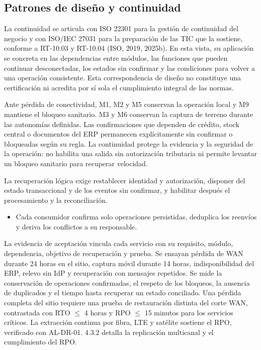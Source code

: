 \subsection{Patrones de diseño y continuidad}

\label{sec:continuidad-logica}

La continuidad se articula con ISO 22301 para la gestión de continuidad del negocio y con ISO/IEC 27031 para la preparación de las TIC que la sostiene, conforme a RT-10.03 y RT-10.04 (ISO, 2019, 2025b). En esta vista, su aplicación se concreta en las dependencias entre módulos, las funciones que pueden continuar desconectadas, los estados sin confirmar y las condiciones para volver a una operación consistente. Esta correspondencia de diseño no constituye una certificación ni acredita por sí sola el cumplimiento integral de las normas.

Ante pérdida de conectividad, M1, M2 y M5 conservan la operación local y M9 mantiene el bloqueo sanitario. M3 y M6 conservan la captura de terreno durante las autonomías definidas. Las confirmaciones que dependen de crédito, stock central o documentos del ERP permanecen explícitamente sin confirmar o bloqueadas según su regla. La continuidad protege la evidencia y la seguridad de la operación: no habilita una salida sin autorización tributaria ni permite levantar un bloqueo sanitario para recuperar velocidad.

La recuperación lógica exige restablecer identidad y autorización, disponer del estado transaccional y de los eventos sin confirmar, y habilitar después el procesamiento y la reconciliación.

\begin{itemize}
  \item Cada consumidor confirma solo operaciones persistidas, deduplica los reenvíos y deriva los conflictos a su responsable.
\end{itemize}

La evidencia de aceptación vincula cada servicio con su requisito, módulo, dependencia, objetivo de recuperación y prueba. Se ensayan pérdida de WAN durante 24 horas en el sitio, captura móvil durante 14 horas, indisponibilidad del ERP, relevo sin IdP y recuperación con mensajes repetidos. Se mide la conservación de operaciones confirmadas, el respeto de los bloqueos, la ausencia de duplicados y el tiempo hasta recuperar un estado conciliado. Una pérdida completa del sitio requiere una prueba de restauración distinta del corte WAN, contrastada con RTO $\leq$ 4 horas y RPO $\leq$ 15 minutos para los servicios críticos. La extracción continua por fibra, LTE y satélite sostiene el RPO, verificado con AL-DR-01. 4.3.2 detalla la replicación multicanal y el cumplimiento del RPO.

